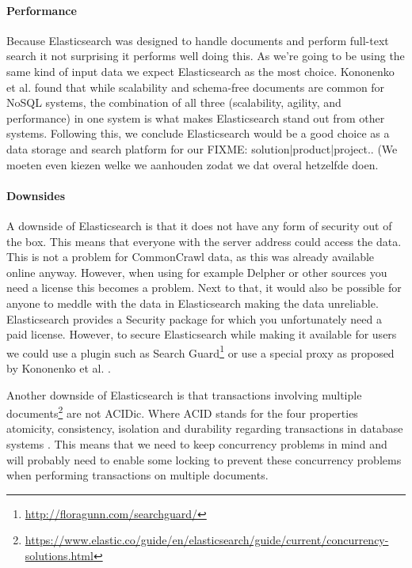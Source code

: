 \paragraph{Performance}
Because Elasticsearch was designed to handle documents and perform full-text search it not surprising it performs well doing this. As we're going to be using the same kind of input data we expect Elasticsearch as the most choice. Kononenko et al. found that while scalability and schema-free documents are common for NoSQL systems, the combination of all three (scalability, agility, and performance) in one system is what makes Elasticsearch stand out from other systems. Following this, we conclude Elasticsearch would be a good choice as a data storage and search platform for our {\color{red} FIXME: solution|product|project.. (We moeten even kiezen welke we aanhouden zodat we dat overal hetzelfde doen}.\\

\paragraph{Downsides} \label{sec:elastic-downsides}
A downside of Elasticsearch is that it does not have any form of security out of the box. This means that everyone with the server address could access the data. This is not a problem for CommonCrawl data, as this was already available online anyway. However, when using for example Delpher or other sources you need a license this becomes a problem. Next to that, it would also be possible for anyone to meddle with the data in Elasticsearch making the data unreliable. Elasticsearch provides a Security package for which you unfortunately need a paid license. However, to secure Elasticsearch while making it available for users we could use a plugin such as Search Guard\footnote{\url{http://floragunn.com/searchguard/}} or use a special proxy as proposed by Kononenko et al. \cite{Kononenko2014}.

Another downside of Elasticsearch is that transactions involving multiple documents\footnote{\url{https://www.elastic.co/guide/en/elasticsearch/guide/current/concurrency-solutions.html}} are not ACIDic. Where ACID stands for the four properties atomicity, consistency, isolation and durability regarding transactions in database systems \cite{haerder1983principles}. This means that we need to keep concurrency problems in mind and will probably need to enable some locking to prevent these concurrency problems when performing transactions on multiple documents. 

